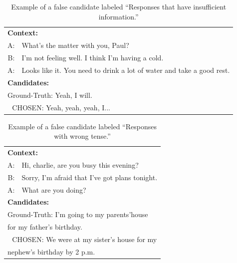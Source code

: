 \documentclass[11pt,a4paper]{article}
\begin{document}
\begin{table}[!h]
    \centering
    \small
    \begin{tabular}{rp{40ex}}
        \toprule
        \multicolumn{2}{l}{\textbf{Context:}} \\
        A: & What’s the matter with you, Paul?\\
        \rule{0pt}{2.5ex}
        B: & I’m not feeling well. I think I’m having a cold.   \\
        \rule{0pt}{2.5ex}
        A: & Looks like it. You need to drink a lot of water and take a good rest. \\
        \midrule
        \multicolumn{2}{l}{\textbf{Candidates:}} \\
        \multicolumn{2}{l}{Ground-Truth: Yeah, I will.}  \\
        \multicolumn{2}{l}{\quad\,\, CHOSEN: Yeah, yeah, yeah, I...} \\
        \bottomrule
    \end{tabular}
    \caption{Example of a false candidate labeled ``Responses that have insufficient information.''}
    \label{tab:insufficient}
\end{table}


\begin{table}[!h]
    \centering
    \small
    \begin{tabular}{rp{40ex}}
        \toprule
        \multicolumn{2}{l}{\textbf{Context:}} \\
        A: & Hi, charlie, are you busy this evening?\\
        \rule{0pt}{2.5ex}
        B: & Sorry, I'm afraid that  I've got plans tonight.   \\
        \rule{0pt}{2.5ex}
        A: & What are you doing? \\
        \midrule
        \multicolumn{2}{l}{\textbf{Candidates:}} \\
        \multicolumn{2}{l}{Ground-Truth: I'm going to my parents'house}\\
        \multicolumn{2}{l}{\hspace{6em} for my father's birthday.}\\
        \multicolumn{2}{l}{\quad\,\, CHOSEN: We were at my sister’s house for my}\\
        \multicolumn{2}{l}{\hspace{6em} nephew’s birthday by 2 p.m.}\\
        \bottomrule
    \end{tabular}
    \caption{Example of a false candidate labeled ``Responses with wrong tense.''}
    \label{tab:tense}
\end{table}
\end{document}
